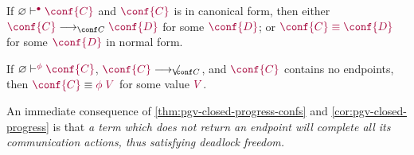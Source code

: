 \begin{thm}\label{thm:pgv-closed-progress-confs}
  If $\cseq[\main]{\emptyenv}{\conf{C}}$ and $\tm{\conf{C}}$ is in canonical form, then either $\tm{\conf{C}}\cred\tm{\conf{D}}$ for some $\tm{\conf{D}}$; or $\tm{\conf{C}\equiv\conf{D}}$ for some $\tm{\conf{D}}$ in normal form.
\end{thm}


\begin{cor}\label{cor:pgv-closed-progress}
  If $\cseq[\phi]{\emptyenv}{\conf{C}}$, $\tm{\conf{C}}\centernot\cred$, and $\tm{\conf{C}}$ contains no endpoints, then $\tm{\conf{C}}\equiv\tm{\phi\;V}$ for some value $\tm{V}$.
\end{cor}


An immediate consequence of \cref{thm:pgv-closed-progress-confs} and \cref{cor:pgv-closed-progress} is that \emph{a term which does not return an endpoint will complete all its communication actions, thus satisfying deadlock freedom.}
